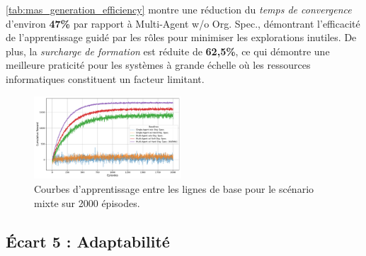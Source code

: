 \autoref{tab:mas_generation_efficiency} montre une réduction du \textit{temps de convergence} d'environ \textbf{47\%} par rapport à Multi-Agent w/o Org. Spec., démontrant l'efficacité de l'apprentissage guidé par les rôles pour minimiser les explorations inutiles. De plus, la \textit{surcharge de formation} est réduite de \textbf{62,5\%}, ce qui démontre une meilleure praticité pour les systèmes à grande échelle où les ressources informatiques constituent un facteur limitant.

\begin{figure}[h!]
  \centering
  \includegraphics[width=0.49\textwidth]{figures/learning_curves.pdf}
  \caption{Courbes d'apprentissage entre les lignes de base pour le scénario mixte sur 2000 épisodes.}
  \label{fig:learning_curves}
\end{figure}


\subsection{Écart 5 : Adaptabilité}

